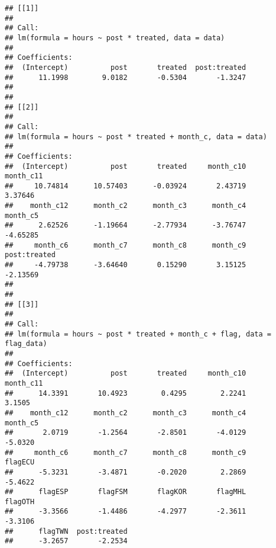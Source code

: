 \documentclass[12pt,]{article}
\begin{document}
\begin{verbatim}
## [[1]]
## 
## Call:
## lm(formula = hours ~ post * treated, data = data)
## 
## Coefficients:
##  (Intercept)          post       treated  post:treated  
##      11.1998        9.0182       -0.5304       -1.3247  
## 
## 
## [[2]]
## 
## Call:
## lm(formula = hours ~ post * treated + month_c, data = data)
## 
## Coefficients:
##  (Intercept)          post       treated     month_c10     month_c11  
##     10.74814      10.57403      -0.03924       2.43719       3.37646  
##    month_c12      month_c2      month_c3      month_c4      month_c5  
##      2.62526      -1.19664      -2.77934      -3.76747      -4.65285  
##     month_c6      month_c7      month_c8      month_c9  post:treated  
##     -4.79738      -3.64640       0.15290       3.15125      -2.13569  
## 
## 
## [[3]]
## 
## Call:
## lm(formula = hours ~ post * treated + month_c + flag, data = flag_data)
## 
## Coefficients:
##  (Intercept)          post       treated     month_c10     month_c11  
##      14.3391       10.4923        0.4295        2.2241        3.1505  
##    month_c12      month_c2      month_c3      month_c4      month_c5  
##       2.0719       -1.2564       -2.8501       -4.0129       -5.0320  
##     month_c6      month_c7      month_c8      month_c9       flagECU  
##      -5.3231       -3.4871       -0.2020        2.2869       -5.4622  
##      flagESP       flagFSM       flagKOR       flagMHL       flagOTH  
##      -3.3566       -1.4486       -4.2977       -2.3611       -3.3106  
##      flagTWN  post:treated  
##      -3.2657       -2.2534
\end{verbatim}
\end{document}
